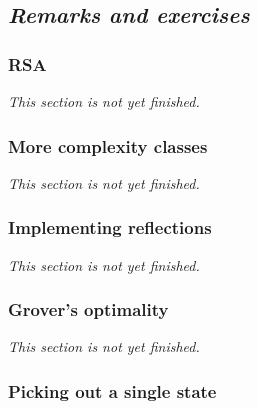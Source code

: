 \documentclass[fleqn,a4paper]{article}
\newenvironment{todo}{\color{primary}\emph{This section is not yet finished.}}{}
\theoremstyle{definition}
\theoremstyle{definition}
\theoremstyle{definition}
\theoremstyle{definition}
\theoremstyle{remark}
\begin{document}
\hypertarget{remarks-and-exercises-algorithms}{%
\subsection{\texorpdfstring{\emph{Remarks and exercises}}{Remarks and exercises}}\label{remarks-and-exercises-algorithms}}

\hypertarget{rsa}{%
\subsubsection{RSA}\label{rsa}}

\begin{todo}

\end{todo}

\hypertarget{more-complexity-classes}{%
\subsubsection{More complexity classes}\label{more-complexity-classes}}

\begin{todo}

\end{todo}

\hypertarget{implementing-reflections}{%
\subsubsection{Implementing reflections}\label{implementing-reflections}}

\begin{todo}

\end{todo}

\hypertarget{grovers-optimality}{%
\subsubsection{Grover's optimality}\label{grovers-optimality}}

\begin{todo}

\end{todo}

\hypertarget{picking-out-a-single-state}{%
\subsubsection{Picking out a single state}\label{picking-out-a-single-state}}
\end{document}
